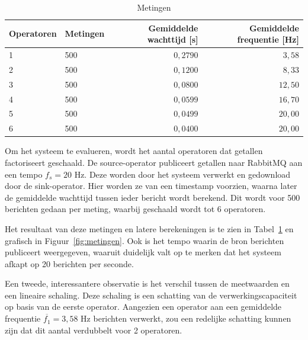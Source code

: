 \documentclass[twocolumn, a4paper]{article}
\begin{document}
\begin{table}[]
    \centering
    \begin{tabular}{@{}llrr@{}}
    \toprule
    Operatoren & Metingen  & Gemiddelde wachttijd [s]                                       & Gemiddelde frequentie [Hz] \\ \midrule
    1          & 500       & $0,2790 $                                              & $3,58$                     \\
    2          & 500       & $0,1200 $                                              & $8,33$                     \\
    3          & 500       & $0,0800$                                             & $12,50$                     \\
    4          & 500       & $0,0599$                                            & $16,70$                     \\
    5          & 500       & $0,0499$                                             & $20,00$                     \\
    6          & 500       & $0,0400$                                             & $20,00$                     \\ \bottomrule
    \end{tabular}
    \caption{Metingen}\label{tab:meaurements}
\end{table}

Om het systeem te evalueren, wordt het aantal operatoren dat getallen factoriseert geschaald. De source-operator publiceert getallen naar RabbitMQ aan een tempo $f_{s} = 20$ Hz. Deze worden door het systeem verwerkt en gedownload door de sink-operator. Hier worden ze van een timestamp voorzien, waarna later de gemiddelde wachttijd tussen ieder bericht wordt berekend. Dit wordt voor 500 berichten gedaan per meting, waarbij geschaald wordt tot 6 operatoren.

Het resultaat van deze metingen en latere berekeningen is te zien in Tabel~\ref{tab:meaurements} en grafisch in Figuur~\ref{fig:metingen}. Ook is het tempo waarin de bron berichten publiceert weergegeven, waaruit duidelijk valt op te merken dat het systeem afkapt op 20 berichten per seconde. 

Een tweede, interessantere observatie is het verschil tussen de meetwaarden en een lineaire schaling. Deze schaling is een schatting van de verwerkingscapaciteit op basis van de eerste operator. Aangezien een operator aan een gemiddelde frequentie $\overline{f_1} = 3,58$ Hz berichten verwerkt, zou een redelijke schatting kunnen zijn dat dit aantal verdubbelt voor 2 operatoren.
\end{document}
